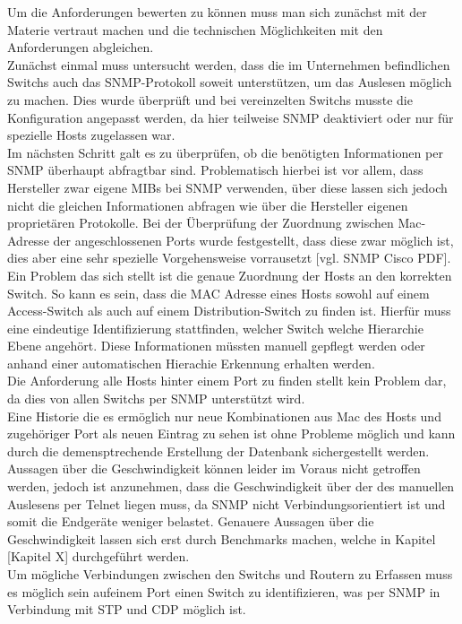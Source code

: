 Um die Anforderungen bewerten zu können muss man sich zunächst mit der Materie vertraut machen und die technischen Möglichkeiten mit den Anforderungen abgleichen.\\
Zunächst einmal muss untersucht werden, dass die im Unternehmen befindlichen Switchs auch das SNMP-Protokoll soweit unterstützen, um das Auslesen möglich zu machen. Dies wurde überprüft und bei vereinzelten Switchs musste die Konfiguration angepasst werden, da hier teilweise SNMP deaktiviert oder nur für spezielle Hosts zugelassen war.\\
Im nächsten Schritt galt es zu überprüfen, ob die benötigten Informationen per SNMP überhaupt abfragtbar sind. Problematisch hierbei ist vor allem, dass Hersteller zwar eigene MIBs bei SNMP verwenden, über diese lassen sich jedoch nicht die gleichen Informationen abfragen wie über die Hersteller eigenen proprietären Protokolle. Bei der Überprüfung der Zuordnung zwischen Mac-Adresse der angeschlossenen Ports wurde festgestellt, dass diese zwar möglich ist, dies aber eine sehr spezielle Vorgehensweise vorrausetzt [vgl. SNMP Cisco PDF].\\
Ein Problem das sich stellt ist die genaue Zuordnung der Hosts an den korrekten Switch. So kann es sein, dass die MAC Adresse eines Hosts sowohl auf einem Access-Switch als auch auf einem Distribution-Switch zu finden ist. Hierfür muss eine eindeutige Identifizierung stattfinden, welcher Switch welche Hierarchie Ebene angehört. Diese Informationen müssten manuell gepflegt werden oder anhand einer automatischen Hierachie Erkennung erhalten werden.\\
Die Anforderung alle Hosts hinter einem Port zu finden stellt kein Problem dar, da dies von allen Switchs per SNMP unterstützt wird. \\
Eine Historie die es ermöglich nur neue Kombinationen aus Mac des Hosts und zugehöriger Port als neuen Eintrag zu sehen ist ohne Probleme möglich und kann durch die demensptrechende Erstellung der Datenbank sichergestellt werden.\\
Aussagen über die Geschwindigkeit können leider im Voraus nicht getroffen werden, jedoch ist anzunehmen, dass die Geschwindigkeit über der des manuellen Auslesens per Telnet liegen muss, da SNMP nicht Verbindungsorientiert ist und somit die Endgeräte weniger belastet. Genauere Aussagen über die Geschwindigkeit lassen sich erst durch Benchmarks machen, welche in Kapitel [Kapitel X] durchgeführt werden.\\
Um mögliche Verbindungen zwischen den Switchs und Routern zu Erfassen muss es möglich sein aufeinem Port einen Switch zu identifizieren, was per SNMP in Verbindung mit STP und CDP möglich ist.\\

